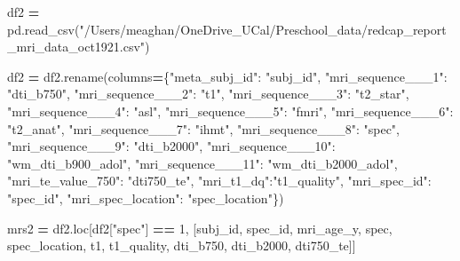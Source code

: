 \documentclass[
]{article}
\newenvironment{Shaded}{\begin{snugshade}}{\end{snugshade}}
\newcommand{\DecValTok}[1]{\textcolor[rgb]{0.00,0.00,0.81}{#1}}
\newcommand{\NormalTok}[1]{#1}
\newcommand{\OperatorTok}[1]{\textcolor[rgb]{0.81,0.36,0.00}{\textbf{#1}}}
\newcommand{\StringTok}[1]{\textcolor[rgb]{0.31,0.60,0.02}{#1}}
\begin{document}
\begin{Shaded}
\begin{Highlighting}[]
\NormalTok{df2 }\OperatorTok{=}\NormalTok{ pd.read\_csv(}\StringTok{"/Users/meaghan/OneDrive\_UCal/Preschool\_data/redcap\_report\_mri\_data\_oct1921.csv"}\NormalTok{)}

\NormalTok{df2 }\OperatorTok{=}\NormalTok{ df2.rename(columns}\OperatorTok{=}\NormalTok{\{}\StringTok{"meta\_subj\_id"}\NormalTok{: }\StringTok{"subj\_id"}\NormalTok{, }\StringTok{"mri\_sequence\_\_\_1"}\NormalTok{: }\StringTok{"dti\_b750"}\NormalTok{, }\StringTok{"mri\_sequence\_\_\_2"}\NormalTok{: }\StringTok{"t1"}\NormalTok{, }\StringTok{"mri\_sequence\_\_\_3"}\NormalTok{: }\StringTok{"t2\_star"}\NormalTok{, }\StringTok{"mri\_sequence\_\_\_4"}\NormalTok{: }\StringTok{"asl"}\NormalTok{, }\StringTok{"mri\_sequence\_\_\_5"}\NormalTok{: }\StringTok{"fmri"}\NormalTok{, }\StringTok{"mri\_sequence\_\_\_6"}\NormalTok{: }\StringTok{"t2\_anat"}\NormalTok{, }\StringTok{"mri\_sequence\_\_\_7"}\NormalTok{: }\StringTok{"ihmt"}\NormalTok{, }\StringTok{"mri\_sequence\_\_\_8"}\NormalTok{: }\StringTok{"spec"}\NormalTok{, }\StringTok{"mri\_sequence\_\_\_9"}\NormalTok{: }\StringTok{"dti\_b2000"}\NormalTok{, }\StringTok{"mri\_sequence\_\_\_10"}\NormalTok{: }\StringTok{"wm\_dti\_b900\_adol"}\NormalTok{, }\StringTok{"mri\_sequence\_\_\_11"}\NormalTok{: }\StringTok{"wm\_dti\_b2000\_adol"}\NormalTok{, }\StringTok{"mri\_te\_value\_750"}\NormalTok{: }\StringTok{"dti750\_te"}\NormalTok{, }\StringTok{"mri\_t1\_dq"}\NormalTok{:}\StringTok{"t1\_quality"}\NormalTok{, }\StringTok{"mri\_spec\_id"}\NormalTok{: }\StringTok{"spec\_id"}\NormalTok{, }\StringTok{"mri\_spec\_location"}\NormalTok{: }\StringTok{"spec\_location"}\NormalTok{\})}

\NormalTok{mrs2 }\OperatorTok{=}\NormalTok{ df2.loc[df2[}\StringTok{"spec"}\NormalTok{] }\OperatorTok{==} \DecValTok{1}\NormalTok{, [}\StringTok{\textquotesingle{}subj\_id\textquotesingle{}}\NormalTok{, }\StringTok{\textquotesingle{}spec\_id\textquotesingle{}}\NormalTok{, }\StringTok{\textquotesingle{}mri\_age\_y\textquotesingle{}}\NormalTok{, }\StringTok{\textquotesingle{}spec\textquotesingle{}}\NormalTok{, }\StringTok{\textquotesingle{}spec\_location\textquotesingle{}}\NormalTok{, }\StringTok{\textquotesingle{}t1\textquotesingle{}}\NormalTok{, }\StringTok{\textquotesingle{}t1\_quality\textquotesingle{}}\NormalTok{, }\StringTok{\textquotesingle{}dti\_b750\textquotesingle{}}\NormalTok{, }\StringTok{\textquotesingle{}dti\_b2000\textquotesingle{}}\NormalTok{, }\StringTok{\textquotesingle{}dti750\_te\textquotesingle{}}\NormalTok{]]}
\end{Highlighting}
\end{Shaded}
\end{document}
